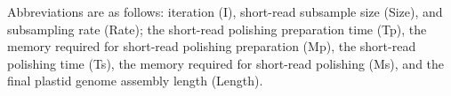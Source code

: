 \begingroup
\scriptsize
\setlength{\parskip}{2pt}

Abbreviations are as follows: 
iteration (I), short-read subsample size (Size), and subsampling rate (Rate);
the short-read polishing preparation time (Tp),
the memory required for short-read polishing preparation (Mp),
the short-read polishing time (Ts),
the memory required for short-read polishing (Ms), and
the final plastid genome assembly length (Length).

\endgroup

